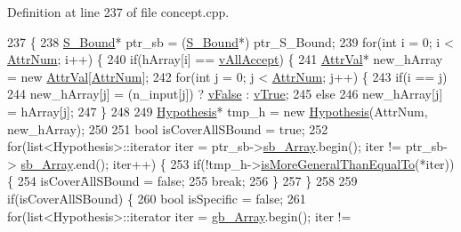 Definition at line 237 of file concept.\-cpp.


\begin{DoxyCode}
237                                                                           \{
238     \hyperlink{class_s___bound}{S\_Bound}* ptr\_sb = (\hyperlink{class_s___bound}{S\_Bound}*) ptr\_S\_Bound;
239     \textcolor{keywordflow}{for}(\textcolor{keywordtype}{int} i = 0; i < \hyperlink{class_g___bound_a7f9e3866c5bf5a55f59949e9b2ff4cce}{AttrNum}; i++) \{
240     \textcolor{keywordflow}{if}(hArray[i] == \hyperlink{concept_8h_a9680d29b8d997e4adbf99481b65e897da6e098ab4d58e23ef1a840e0a338ef96f}{vAllAccept}) \{
241         \hyperlink{concept_8h_a9680d29b8d997e4adbf99481b65e897d}{AttrVal}* new\_hArray = \textcolor{keyword}{new} \hyperlink{concept_8h_a9680d29b8d997e4adbf99481b65e897d}{AttrVal}[\hyperlink{class_g___bound_a7f9e3866c5bf5a55f59949e9b2ff4cce}{AttrNum}];
242         \textcolor{keywordflow}{for}(\textcolor{keywordtype}{int} j = 0; j < \hyperlink{class_g___bound_a7f9e3866c5bf5a55f59949e9b2ff4cce}{AttrNum}; j++) \{
243         \textcolor{keywordflow}{if}(i == j)
244             new\_hArray[j] = (n\_input[j]) ? \hyperlink{concept_8h_a9680d29b8d997e4adbf99481b65e897da6abf5f6bc00d14e28def1d3fe93a3d86}{vFalse} : \hyperlink{concept_8h_a9680d29b8d997e4adbf99481b65e897daa93dca41b1b135be638ced74a424f102}{vTrue};
245         \textcolor{keywordflow}{else}
246             new\_hArray[j] = hArray[j];
247         \}
248         
249         \hyperlink{class_hypothesis}{Hypothesis}* tmp\_h = \textcolor{keyword}{new} \hyperlink{class_hypothesis}{Hypothesis}(AttrNum, new\_hArray);
250 
251         \textcolor{keywordtype}{bool} isCoverAllSBound = \textcolor{keyword}{true};
252         \textcolor{keywordflow}{for}(list<Hypothesis>::iterator iter = ptr\_sb->\hyperlink{class_s___bound_a06e45530f4b7a999dfaa17ca73ef1d4f}{sb\_Array}.begin(); iter != ptr\_sb->
      \hyperlink{class_s___bound_a06e45530f4b7a999dfaa17ca73ef1d4f}{sb\_Array}.end(); iter++) \{
253         \textcolor{keywordflow}{if}(!tmp\_h->\hyperlink{class_hypothesis_ab8d9d311060a302fe11457b067898e24}{isMoreGeneralThanEqualTo}(*iter)) \{
254             isCoverAllSBound = \textcolor{keyword}{false};
255             \textcolor{keywordflow}{break};
256         \}
257         \}
258         
259         \textcolor{keywordflow}{if}(isCoverAllSBound) \{
260         \textcolor{keywordtype}{bool} isSpecific = \textcolor{keyword}{false};
261         \textcolor{keywordflow}{for}(list<Hypothesis>::iterator iter = \hyperlink{class_g___bound_ace60790dcb7f10a2caa157abe1aa838f}{gb\_Array}.begin(); iter != 

\end{DoxyCode}
